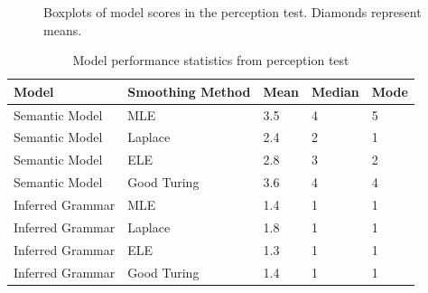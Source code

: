 \documentclass[a4paper,12pt]{article}
\begin{document}
\begin{figure}%
    \centering
    \qquad
    \qquad
    \caption{Boxplots of model scores in the perception test. Diamonds represent   means.}%
  \label{fig:boxplots}
\end{figure}

\begin{table}[]
\centering
\caption{Model performance statistics from perception test}
\label{tab:modelStats}
\begin{tabular}{@{}lllll@{}}
\toprule
Model            & Smoothing Method & Mean & Median & Mode \\ \midrule
Semantic Model   & MLE              & 3.5  & 4      & 5    \\
Semantic Model   & Laplace          & 2.4  & 2      & 1    \\
Semantic Model   & ELE              & 2.8  & 3      & 2    \\
Semantic Model   & Good Turing      & 3.6  & 4      & 4    \\
Inferred Grammar & MLE              & 1.4  & 1      & 1    \\
Inferred Grammar & Laplace          & 1.8  & 1      & 1    \\
Inferred Grammar & ELE              & 1.3  & 1      & 1    \\
Inferred Grammar & Good Turing      & 1.4  & 1      & 1    \\ \bottomrule
\end{tabular}
\end{table}
\end{document}
